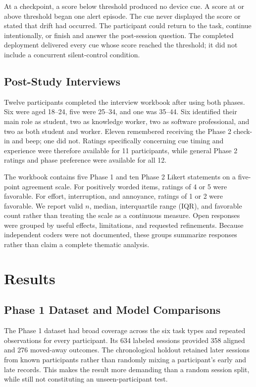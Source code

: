 \documentclass[12pt,a4paper]{article}
\begin{document}
At a checkpoint, a score below threshold produced no device cue. A score at or above threshold began one alert episode. The cue never displayed the score or stated that drift had occurred. The participant could return to the task, continue intentionally, or finish and answer the post-session question. The completed deployment delivered every cue whose score reached the threshold; it did not include a concurrent silent-control condition.

\subsection{Post-Study Interviews}

Twelve participants completed the interview workbook after using both phases. Six were aged 18--24, five were 25--34, and one was 35--44. Six identified their main role as student, two as knowledge worker, two as software professional, and two as both student and worker. Eleven remembered receiving the Phase 2 check-in and beep; one did not. Ratings specifically concerning cue timing and experience were therefore available for 11 participants, while general Phase 2 ratings and phase preference were available for all 12.

The workbook contains five Phase 1 and ten Phase 2 Likert statements on a five-point agreement scale. For positively worded items, ratings of 4 or 5 were favorable. For effort, interruption, and annoyance, ratings of 1 or 2 were favorable. We report valid $n$, median, interquartile range (IQR), and favorable count rather than treating the scale as a continuous measure. Open responses were grouped by useful effects, limitations, and requested refinements. Because independent coders were not documented, these groups summarize responses rather than claim a complete thematic analysis.

\section{Results}

\subsection{Phase 1 Dataset and Model Comparisons}

The Phase 1 dataset had broad coverage across the six task types and repeated observations for every participant. Its 634 labeled sessions provided 358 aligned and 276 moved-away outcomes. The chronological holdout retained later sessions from known participants rather than randomly mixing a participant's early and late records. This makes the result more demanding than a random session split, while still not constituting an unseen-participant test.
\end{document}
